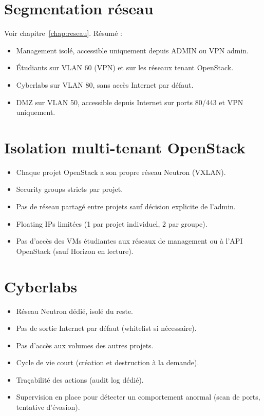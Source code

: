 \section{Segmentation réseau}
Voir chapitre~\ref{chap:reseau}. Résumé :
\begin{itemize}
  \item Management isolé, accessible uniquement depuis ADMIN ou VPN admin.
  \item Étudiants sur VLAN 60 (VPN) et sur les réseaux tenant OpenStack.
  \item Cyberlabs sur VLAN 80, sans accès Internet par défaut.
  \item DMZ sur VLAN 50, accessible depuis Internet sur ports 80/443 et VPN uniquement.
\end{itemize}

\section{Isolation multi-tenant OpenStack}
\begin{itemize}
  \item Chaque projet OpenStack a son propre réseau Neutron (VXLAN).
  \item Security groups stricts par projet.
  \item Pas de réseau partagé entre projets sauf décision explicite de l'admin.
  \item Floating IPs limitées (1 par projet individuel, 2 par groupe).
  \item Pas d'accès des VMs étudiantes aux réseaux de management ou à l'API OpenStack (sauf Horizon en lecture).
\end{itemize}

\section{Cyberlabs}
\begin{itemize}
  \item Réseau Neutron dédié, isolé du reste.
  \item Pas de sortie Internet par défaut (whitelist si nécessaire).
  \item Pas d'accès aux volumes des autres projets.
  \item Cycle de vie court (création et destruction à la demande).
  \item Traçabilité des actions (audit log dédié).
  \item Supervision en place pour détecter un comportement anormal (scan de ports, tentative d'évasion).
\end{itemize}

